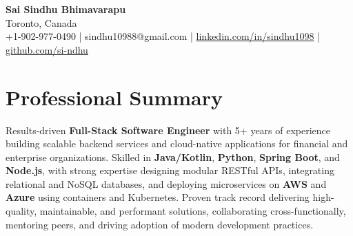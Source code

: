 \documentclass[letterpaper,11pt]{article}
\begin{document}
\begin{center}
  {\Large \textbf{Sai Sindhu Bhimavarapu}} \\
  Toronto, Canada \\
  +1-902-977-0490 \enspace | \enspace sindhu10988@gmail.com \enspace | \enspace \href{https://www.linkedin.com/in/sindhu1098/}{linkedin.com/in/sindhu1098} \enspace | \enspace \href{https://github.com/si-ndhu}{github.com/si-ndhu}
\end{center}

\section{Professional Summary}
  \begin{itemize}[leftmargin=0.15in, label={}]
    \small{\item{
     Results-driven \textbf{Full-Stack Software Engineer} with 5+ years of experience building scalable backend services and cloud-native applications for financial and enterprise organizations. Skilled in \textbf{Java/Kotlin}, \textbf{Python}, \textbf{Spring Boot}, and \textbf{Node.js}, with strong expertise designing modular RESTful APIs, integrating relational and NoSQL databases, and deploying microservices on \textbf{AWS} and \textbf{Azure} using containers and Kubernetes. Proven track record delivering high-quality, maintainable, and performant solutions, collaborating cross-functionally, mentoring peers, and driving adoption of modern development practices.
    }}
  \end{itemize}
\vspace{-16pt}

\end{document}
